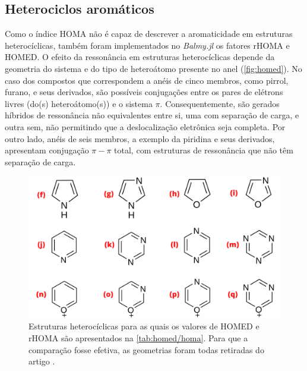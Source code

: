 \subsection{Heterociclos aromáticos}

Como o índice \gls{HOMA} não é capaz de descrever a aromaticidade em estruturas heterocíclicas, também foram implementados no \textit{Balmy.jl} os fatores \gls{rHOMA} e \gls{HOMED}. O efeito da ressonância em estruturas heterocíclicas depende da geometria do sistema e do tipo de heteroátomo presente no anel (\autoref{fig:homed}). No caso dos compostos que correspondem a anéis de cinco membros, como pirrol, furano, e seus derivados, são possíveis conjugações entre os pares de elétrons livres (do(s) heteroátomo(s)) e o sistema $\pi$. Consequentemente, são gerados híbridos de ressonância não equivalentes entre si, uma com separação de carga, e outra sem, não permitindo que a deslocalização eletrônica seja completa. Por outro lado, anéis de seis membros, a exemplo da piridina e seus derivados, apresentam conjugação $\pi-\pi$ total, com estruturas de ressonância que não têm separação de carga.

\begin{figure}[htb]
\caption{\label{fig:homed} Estruturas heterocíclicas para as quais os valores de \gls{HOMED} e \gls{rHOMA} são apresentados na \autoref{tab:homed/homa}. Para que a comparação fosse efetiva, as geometrias foram todas retiradas do artigo \cite{giov2020}.}
	\begin{center}
		\includegraphics[width=1.0\textwidth]{images/fig2(7).png}
	\end{center}
\end{figure}


